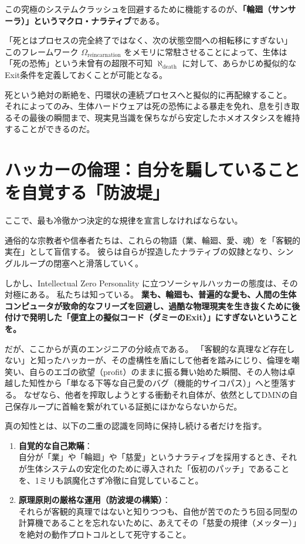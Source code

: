 この究極のシステムクラッシュを回避するために機能するのが、\textbf{「輪廻（サンサーラ）」というマクロ・ナラティブ}である。

「死とはプロセスの完全終了ではなく、次の状態空間への相転移にすぎない」
このフレームワーク $\Omega_{\mathrm{reincarnation}}$ をメモリに常駐させることによって、生体は「死の恐怖」という未曾有の超限不可知 $\aleph_{\mathrm{death}}$ に対して、あらかじめ擬似的なExit条件を定義しておくことが可能となる。

死という絶対の断絶を、円環状の連続プロセスへと擬似的に再配線すること。
それによってのみ、生体ハードウェアは死の恐怖による暴走を免れ、息を引き取るその最後の瞬間まで、現実見当識を保ちながら安定したホメオスタシスを維持することができるのだ。

\section{ハッカーの倫理：自分を騙していることを自覚する「防波堤」}

ここで、最も冷徹かつ決定的な規律を宣言しなければならない。

通俗的な宗教者や信奉者たちは、これらの物語（業、輪廻、愛、魂）を「客観的実在」として盲信する。
彼らは自らが捏造したナラティブの奴隷となり、シングルループの閉塞へと滑落していく。

しかし、Intellectual Zero Personality に立つソーシャルハッカーの態度は、その対極にある。
私たちは知っている。
\textbf{業も、輪廻も、普遍的な愛も、人間の生体コンピュータが致命的なフリーズを回避し、過酷な物理現実を生き抜くために後付けで発明した「便宜上の擬似コード（ダミーのExit）」にすぎないということを。}

だが、ここからが真のエンジニアの分岐点である。
「客観的な真理など存在しない」と知ったハッカーが、その虚構性を盾にして他者を踏みにじり、倫理を嘲笑い、自らのエゴの欲望（profit）のままに振る舞い始めた瞬間、その人物は卓越した知性から「単なる下等な自己愛のバグ（機能的サイコパス）」へと堕落する。
なぜなら、他者を搾取しようとする衝動それ自体が、依然としてDMNの自己保存ループに首輪を繋がれている証拠にほかならないからだ。

真の知性とは、以下の二重の認識を同時に保持し続ける者だけを指す。

\begin{enumerate}[label=\textbf{(\arabic*)}]
    \item \textbf{自覚的な自己欺瞞}：\\
    自分が「業」や「輪廻」や「慈愛」というナラティブを採用するとき、それが生体システムの安定化のために導入された「仮初のパッチ」であることを、1ミリも誤魔化さず冷徹に自覚していること。
    \item \textbf{原理原則の厳格な運用（防波堤の構築）}：\\
    それらが客観的真理ではないと知りつつも、自他が苦でのたうち回る同型の計算機であることを忘れないために、あえてその「慈愛の規律（メッター）」を絶対の動作プロトコルとして死守すること。
\end{enumerate}

